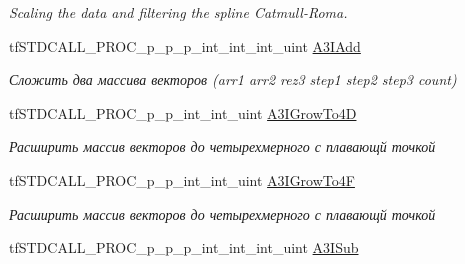 \begin{DoxyCompactItemize}
\begin{DoxyCompactList}\small\item\em Scaling the data and filtering the spline Catmull-\/\-Roma. \end{DoxyCompactList}\item 
\hypertarget{structs_functions_array_vector_c_p_u_a2a22cbd694fd1951840e604bf7bdba1f}{tf\-S\-T\-D\-C\-A\-L\-L\-\_\-\-P\-R\-O\-C\-\_\-p\-\_\-p\-\_\-p\-\_\-int\-\_\-int\-\_\-int\-\_\-uint \hyperlink{structs_functions_array_vector_c_p_u_a2a22cbd694fd1951840e604bf7bdba1f}{A3\-I\-Add}}\label{structs_functions_array_vector_c_p_u_a2a22cbd694fd1951840e604bf7bdba1f}

\begin{DoxyCompactList}\small\item\em Сложить два массива векторов (arr1 arr2 rez3 step1 step2 step3 count) \end{DoxyCompactList}\item 
\hypertarget{structs_functions_array_vector_c_p_u_aa93f5aa64eb6156c4b3326e0cf478e93}{tf\-S\-T\-D\-C\-A\-L\-L\-\_\-\-P\-R\-O\-C\-\_\-p\-\_\-p\-\_\-int\-\_\-int\-\_\-uint \hyperlink{structs_functions_array_vector_c_p_u_aa93f5aa64eb6156c4b3326e0cf478e93}{A3\-I\-Grow\-To4\-D}}\label{structs_functions_array_vector_c_p_u_aa93f5aa64eb6156c4b3326e0cf478e93}

\begin{DoxyCompactList}\small\item\em Расширить массив векторов до четырехмерного с плавающй точкой \end{DoxyCompactList}\item 
\hypertarget{structs_functions_array_vector_c_p_u_a0f04caa350500ef38e84e90630f07748}{tf\-S\-T\-D\-C\-A\-L\-L\-\_\-\-P\-R\-O\-C\-\_\-p\-\_\-p\-\_\-int\-\_\-int\-\_\-uint \hyperlink{structs_functions_array_vector_c_p_u_a0f04caa350500ef38e84e90630f07748}{A3\-I\-Grow\-To4\-F}}\label{structs_functions_array_vector_c_p_u_a0f04caa350500ef38e84e90630f07748}

\begin{DoxyCompactList}\small\item\em Расширить массив векторов до четырехмерного с плавающй точкой \end{DoxyCompactList}\item 
\hypertarget{structs_functions_array_vector_c_p_u_af65cff5e9113b0e2cae886df0b86ef6b}{tf\-S\-T\-D\-C\-A\-L\-L\-\_\-\-P\-R\-O\-C\-\_\-p\-\_\-p\-\_\-p\-\_\-int\-\_\-int\-\_\-int\-\_\-uint \hyperlink{structs_functions_array_vector_c_p_u_af65cff5e9113b0e2cae886df0b86ef6b}{A3\-I\-Sub}}\label{structs_functions_array_vector_c_p_u_af65cff5e9113b0e2cae886df0b86ef6b}


\end{DoxyCompactItemize}
